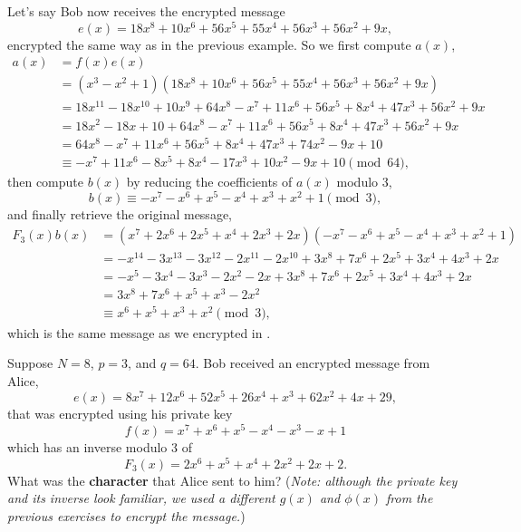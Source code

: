 \begin{example}
    Let's say Bob now receives the encrypted message
    \[
        e(x) = 18x^8 + 10x^6 + 56x^5 + 55x^4 + 56x^3 + 56x^2 + 9x,
    \]
    encrypted the same way as in the previous example. So we first compute $a(x)$,
    \begin{align*}
        a(x) &= f(x)e(x)\\
        &= (x^3 - x^2 + 1)(18x^8 + 10x^6 + 56x^5 + 55x^4 + 56x^3 + 56x^2 + 9x)\\
        &= 18x^{11} - 18x^{10} + 10x^9 + 64x^8 - x^7 + 11x^6 + 56x^5 + 8x^4 + 47x^3 + 56x^2 + 9x\\
        &= 18x^2 - 18x + 10 + 64x^8 - x^7 + 11x^6 + 56x^5 + 8x^4 + 47x^3 + 56x^2 + 9x\\
        &= 64x^8 - x^7 + 11x^6 + 56x^5 + 8x^4 + 47x^3 + 74x^2 - 9x + 10\\
        &\equiv -x^7 + 11x^6 - 8x^5 + 8x^4 - 17x^3 + 10x^2 - 9x + 10 \pmod{64},
    \end{align*}
    then compute $b(x)$ by reducing the coefficients of $a(x)$ modulo 3,
    \[
        b(x) \equiv -x^7 - x^6 + x^5 - x^4 + x^3 + x^2 + 1 \pmod{3},
    \]
    and finally retrieve the original message,
    \begin{align*}
        F_3(x)b(x) &= (x^7 + 2x^6 + 2x^5 +x^4 + 2x^3 + 2x)(-x^7 - x^6 + x^5 - x^4 + x^3 + x^2 + 1)\\
        &= -x^{14} - 3x^{13} - 3x^{12} - 2x^{11} - 2x^{10} + 3x^8 + 7x^6 + 2x^5 + 3x^4 + 4x^3 + 2x\\
        &= -x^5 - 3x^4 - 3x^3 - 2x^2 - 2x + 3x^8 + 7x^6 + 2x^5 + 3x^4 + 4x^3 + 2x\\
        &= 3x^8 + 7x^6 + x^5 + x^3 - 2x^2\\
        &\equiv x^6 + x^5 + x^3 + x^2 \pmod{3},
    \end{align*}
    which is the same message as we encrypted in .
\end{example}

\begin{exercise}
    Suppose $N = 8$, $p = 3$, and $q = 64$. Bob received an encrypted message from Alice,
    \[
        e(x) = 8x^7 + 12x^6 + 52x^5 + 26x^4 +x^3 + 62x^2 + 4x + 29,
    \]
    that was encrypted using his private key
    \[
        f(x) = x^7 +x^6 +x^5 -x^4 -x^3 -x + 1
    \]
    which has an inverse modulo 3 of
    \[
        F_3(x) = 2x^6 +x^5 +x^4 + 2x^2 + 2x + 2.
    \]
    What was the \textbf{character} that Alice sent to him?\newline
    (\textit{Note: although the private key and its inverse look familiar, we used a different $g(x)$ and $\phi(x)$ from the previous exercises to encrypt the message.})
\end{exercise}

